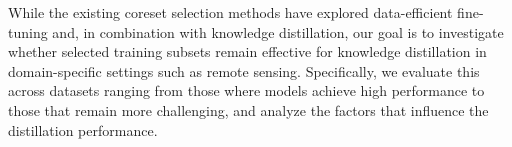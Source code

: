 \documentclass[conference]{IEEEtran}
\begin{document}
While the existing coreset selection methods have explored data-efficient fine-tuning and, in combination with knowledge distillation, our goal is to investigate whether selected training subsets remain effective for knowledge distillation in domain-specific settings such as remote sensing.
Specifically, we evaluate this across datasets ranging from those where models achieve high performance to those that remain more challenging, and analyze the factors that influence the distillation performance.

\end{document}
